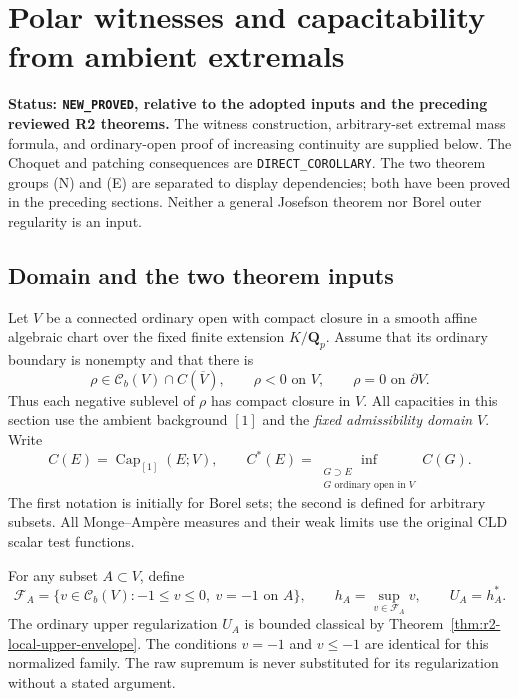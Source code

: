 \documentclass[11pt,a4paper]{article}
\numberwithin{equation}{section}
\theoremstyle{definition}
\theoremstyle{remark}
\newcommand{\Cb}{\mathcal C_b}
\begin{document}


\section{Polar witnesses and capacitability from ambient extremals}
\label{sec:r2-polar-converse-choquet}

\noindent\textbf{Status: \texttt{NEW\_PROVED}, relative to the adopted
inputs and the preceding reviewed R2 theorems.}
The witness construction, arbitrary-set extremal mass formula, and
ordinary-open proof of increasing continuity are supplied below.
The Choquet and patching consequences are
\texttt{DIRECT\_COROLLARY}. The two theorem groups
\textup{(N)} and \textup{(E)} are separated to display dependencies;
both have been proved in the preceding sections. Neither a general
Josefson theorem nor Borel outer regularity is an input.

\subsection{Domain and the two theorem inputs}

Let $V$ be a connected ordinary open with compact closure in a smooth
affine algebraic chart over the fixed finite extension $K/\mathbf Q_p$.
Assume that its ordinary boundary is nonempty and that there is
\[
 \rho\in\Cb(V)\cap C(\overline V),\qquad
 \rho<0\text{ on }V,\qquad \rho=0\text{ on }\partial V.
\]
Thus each negative sublevel of $\rho$ has compact closure in $V$.
All capacities in this section use the ambient background $[1]$ and
the \emph{fixed admissibility domain $V$}. Write
\[
 C(E)=\operatorname{Cap}_{[1]}(E;V),\qquad
 C^*(E)=\inf_{\substack{G\supset E\\G\text{ ordinary open in }V}}C(G).
\]
The first notation is initially for Borel sets; the second is defined
for arbitrary subsets. All Monge--Amp\`ere measures and their weak
limits use the original CLD scalar test functions.

For any subset $A\subset V$, define
\[
 \mathcal F_A=\{v\in\Cb(V):-1\leq v\leq0,\ v=-1\text{ on }A\},
 \qquad h_A=\sup_{v\in\mathcal F_A}v,\qquad U_A=h_A^*.
\]
The ordinary upper regularization $U_A$ is bounded classical by
Theorem~\ref{thm:r2-local-upper-envelope}. The conditions $v=-1$
and $v\leq-1$ are identical for this normalized family. The raw
supremum is never substituted for its regularization without a
stated argument.
\end{document}

